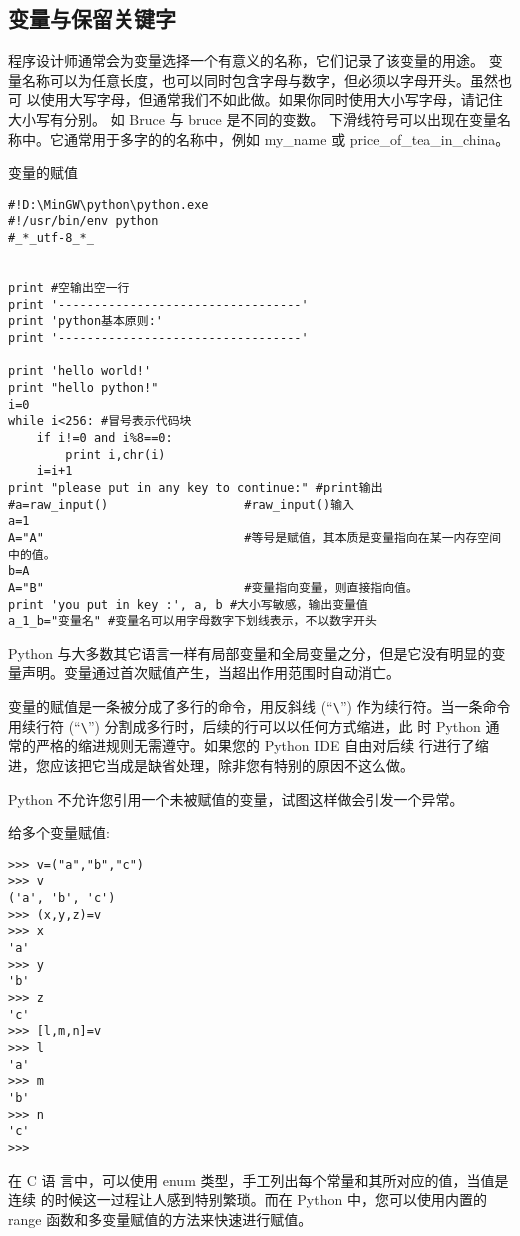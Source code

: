 \documentclass[twoside,11pt]{book}
\begin{document}
\subsection{变量与保留关键字}

程序设计师通常会为变量选择一个有意义的名称，它们记录了该变量的用途。
变量名称可以为任意长度，也可以同时包含字母与数字，但必须以字母开头。虽然也可
以使用大写字母，但通常我们不如此做。如果你同时使用大小写字母，请记住大小写有分别。
如 Bruce 与 bruce 是不同的变数。
下滑线符号可以出现在变量名称中。它通常用于多字的的名称中，例如 my\_name 或
price\_of\_tea\_in\_china。

变量的赋值


\begin{lstlisting}
#!D:\MinGW\python\python.exe
#!/usr/bin/env python
#_*_utf-8_*_


print #空输出空一行
print '----------------------------------'
print 'python基本原则:'
print '----------------------------------'

print 'hello world!'
print "hello python!"
i=0
while i<256: #冒号表示代码块
    if i!=0 and i%8==0:
        print i,chr(i)
    i=i+1
print "please put in any key to continue:" #print输出
#a=raw_input()                   #raw_input()输入
a=1
A="A"                            #等号是赋值，其本质是变量指向在某一内存空间中的值。
b=A
A="B"                            #变量指向变量，则直接指向值。
print 'you put in key :', a, b #大小写敏感，输出变量值
a_1_b="变量名" #变量名可以用字母数字下划线表示，不以数字开头
\end{lstlisting}

Python 与大多数其它语言一样有局部变量和全局变量之分，但是它没有明显的变量声明。变量通过首次赋值产生，当超出作用范围时自动消亡。

变量的赋值是一条被分成了多行的命令，用反斜线 (“\verb|\|”) 作为续行符。当一条命令用续行符 (“\verb|\|”) 分割成多行时，后续的行可以以任何方式缩进，此 时 Python 通常的严格的缩进规则无需遵守。如果您的 Python IDE 自由对后续 行进行了缩进，您应该把它当成是缺省处理，除非您有特别的原因不这么做。

Python 不允许您引用一个未被赋值的变量，试图这样做会引发一个异常。

给多个变量赋值:
\begin{lstlisting}
>>> v=("a","b","c")
>>> v
('a', 'b', 'c')
>>> (x,y,z)=v
>>> x
'a'
>>> y
'b'
>>> z
'c'
>>> [l,m,n]=v
>>> l
'a'
>>> m
'b'
>>> n
'c'
>>>
\end{lstlisting}

在 C 语 言中，可以使用 enum 类型，手工列出每个常量和其所对应的值，当值是连续 的时候这一过程让人感到特别繁琐。而在 Python 中，您可以使用内置的 range 函数和多变量赋值的方法来快速进行赋值。
\end{document}
